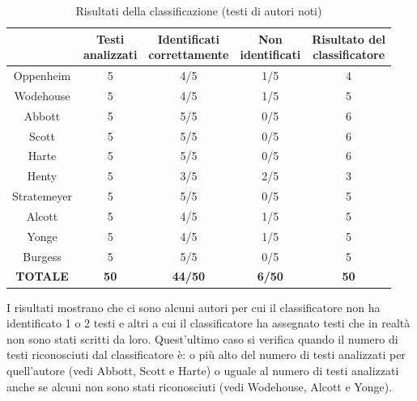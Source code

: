 \documentclass[titlepage]{article}
\begin{document}
\begin{table}[htp]
\centering
\footnotesize
\begin{tabular}{ccccc}
    \toprule
     & \makecell{\textbf{Testi} \\ \textbf{analizzati}} & \makecell{\textbf{Identificati} \\ \textbf{correttamente}} & \makecell{\textbf{Non} \\ \textbf{identificati}} & \makecell{\textbf{Risultato del} \\ \textbf{classificatore}} \\
    
    \midrule
    Oppenheim & 5 & 4/5 & 1/5 & 4 \\
    
    \midrule
    Wodehouse & 5 & 4/5 & 1/5 & 5 \\
    
    \midrule
    Abbott & 5 & 5/5 & 0/5 & 6 \\
    
    \midrule
    Scott & 5 & 5/5 & 0/5 & 6 \\
    
    \midrule
    Harte & 5 & 5/5 & 0/5 & 6 \\
    
    \midrule
    Henty & 5 & 3/5 & 2/5 & 3 \\
    
    \midrule
    Stratemeyer & 5 & 5/5 & 0/5 & 5 \\
    
    \midrule
    Alcott & 5 & 4/5 & 1/5 & 5 \\
    
    \midrule
    Yonge & 5 & 4/5 & 1/5 & 5 \\
    
    \midrule
    Burgess & 5 & 5/5 & 0/5 & 5 \\
    
    \midrule
    \textbf{TOTALE} & \textbf{50} & \textbf{44/50} & \textbf{6/50} & \textbf{50} \\
    
    \bottomrule
\end{tabular}
\caption{Risultati della classificazione (testi di autori noti)}
\end{table}

\noindent
I risultati mostrano che ci sono alcuni autori per cui il classificatore non ha identificato 1 o 2 testi e altri a cui il classificatore ha assegnato testi che in realtà non sono stati scritti da loro. Quest'ultimo caso si verifica quando il numero di testi riconosciuti dal classificatore è: o più alto del numero di testi analizzati per quell'autore (vedi Abbott, Scott e Harte) o uguale al numero di testi analizzati anche se alcuni non sono stati riconosciuti (vedi Wodehouse, Alcott e Yonge).
\end{document}
